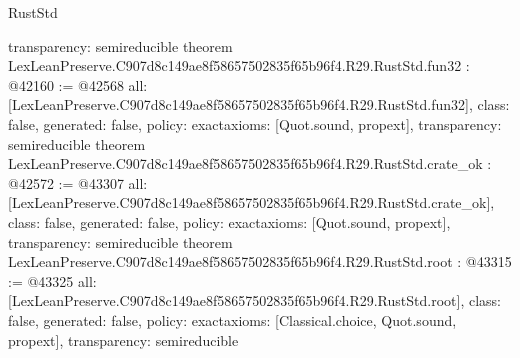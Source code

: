 \begin{lexlean}{RustStd}
\begin{coremodule}
{  transparency: semireducible
}
theorem LexLeanPreserve.C907d8c149ae8f58657502835f65b96f4.R29.RustStd.fun32 : @42160 := @42568 {
  all: [LexLeanPreserve.C907d8c149ae8f58657502835f65b96f4.R29.RustStd.fun32],
  class: false,
  generated: false,
  policy: exact{axioms: [Quot.sound, propext]},
  transparency: semireducible
}
theorem LexLeanPreserve.C907d8c149ae8f58657502835f65b96f4.R29.RustStd.crate_ok : @42572 := @43307 {
  all: [LexLeanPreserve.C907d8c149ae8f58657502835f65b96f4.R29.RustStd.crate_ok],
  class: false,
  generated: false,
  policy: exact{axioms: [Quot.sound, propext]},
  transparency: semireducible
}
theorem LexLeanPreserve.C907d8c149ae8f58657502835f65b96f4.R29.RustStd.root : @43315 := @43325 {
  all: [LexLeanPreserve.C907d8c149ae8f58657502835f65b96f4.R29.RustStd.root],
  class: false,
  generated: false,
  policy: exact{axioms: [Classical.choice, Quot.sound, propext]},
  transparency: semireducible
}


\end{coremodule}
\end{lexlean}
